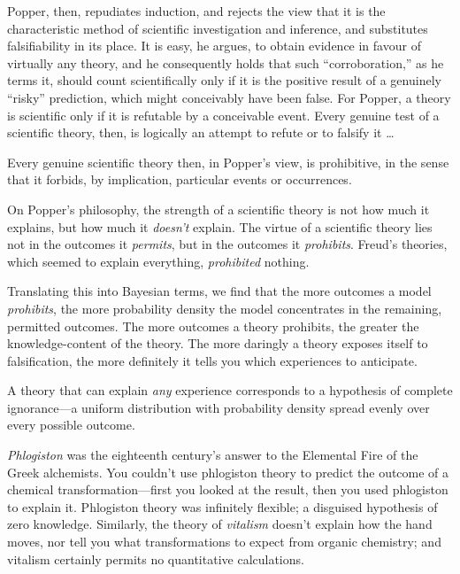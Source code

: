 {
 Popper, then, repudiates induction, and rejects the view that it
is the characteristic method of scientific investigation and inference,
and substitutes falsifiability in its place. It is easy, he argues, to
obtain evidence in favour of virtually any theory, and he consequently
holds that such ``corroboration,''
as he terms it, should count scientifically only if it is the positive
result of a genuinely ``risky''
prediction, which might conceivably have been false. For Popper, a
theory is scientific only if it is refutable by a conceivable event.
Every genuine test of a scientific theory, then, is logically an
attempt to refute or to falsify it \ldots}

{
 Every genuine scientific theory then, in Popper's
view, is prohibitive, in the sense that it forbids, by implication,
particular events or occurrences.}

{
 On Popper's philosophy, the strength of a
scientific theory is not how much it explains, but how much it
\textit{doesn't} explain. The virtue of a scientific
theory lies not in the outcomes it \textit{permits}, but in the
outcomes it \textit{prohibits}. Freud's theories, which
seemed to explain everything, \textit{prohibited} nothing.}

{
 Translating this into Bayesian terms, we find that the more
outcomes a model \textit{prohibits}, the more probability density the
model concentrates in the remaining, permitted outcomes. The more
outcomes a theory prohibits, the greater the knowledge-content of the
theory. The more daringly a theory exposes itself to falsification, the
more definitely it tells you which experiences to anticipate.}

{
 A theory that can explain \textit{any} experience corresponds to a
hypothesis of complete ignorance---a uniform distribution with
probability density spread evenly over every possible outcome.}

{
 \textit{Phlogiston} was the eighteenth century's
answer to the Elemental Fire of the Greek alchemists. You
couldn't use phlogiston theory to predict the outcome
of a chemical transformation---first you looked at the result, then you
used phlogiston to explain it. Phlogiston theory was infinitely
flexible; a disguised hypothesis of zero knowledge. Similarly, the
theory of \textit{vitalism} doesn't explain how the
hand moves, nor tell you what transformations to expect from organic
chemistry; and vitalism certainly permits no quantitative
calculations.}

